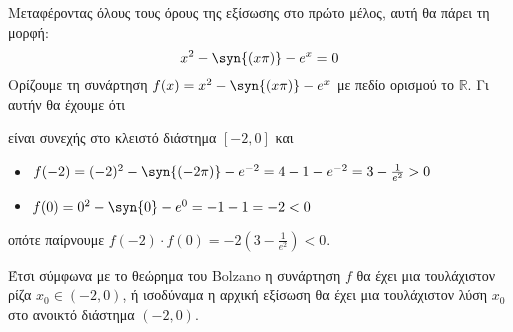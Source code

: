 Μεταφέροντας όλους τους όρους της εξίσωσης στο πρώτο μέλος, αυτή θα πάρει τη μορφή:
\[ x^2-\syn{(x\pi)}-e^x=0 \]
Ορίζουμε τη συνάρτηση $ f(x)=x^2-\syn{(x\pi)}-e^x $ με πεδίο ορισμού το $ \mathbb{R} $. Γι αυτήν θα έχουμε ότι
\begin{rlist}
\item είναι συνεχής στο κλειστό διάστημα $ [-2,0] $ και
\item \begin{itemize}
\item $ f(-2)=(-2)^2-\syn{(-2\pi)}-e^{-2}=4-1-e^{-2}=3-\frac{1}{e^2}>0 $
\item $ f(0)=0^2-\syn{0}-e^0=-1-1=-2<0 $
\end{itemize}
οπότε παίρνουμε $ f(-2)\cdot f(0)=-2\left(3-\frac{1}{e^2} \right)<0 $.
\end{rlist}
Έτσι σύμφωνα με το θεώρημα του Bolzano η συνάρτηση $ f $ θα έχει μια τουλάχιστον ρίζα $ x_0\in(-2,0) $, ή ισοδύναμα η αρχική εξίσωση θα έχει μια τουλάχιστον λύση $ x_0 $ στο ανοικτό διάστημα $ (-2,0) $.
